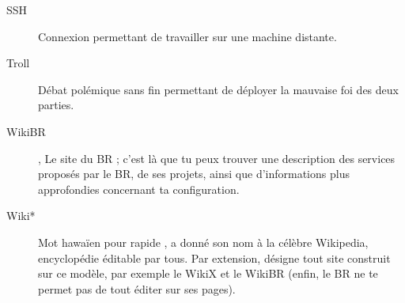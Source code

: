 \begin{description}
  \item[SSH] Connexion permettant de travailler sur une machine distante.
  \item[Troll] Débat polémique sans fin permettant de déployer la mauvaise foi des deux parties.
  \item[WikiBR] , Le site du BR ; c'est là que tu peux trouver une description des services proposés par le BR, de ses projets, ainsi que
  d'informations plus approfondies concernant ta configuration.
  \item[Wiki*] Mot hawaïen pour \og rapide \fg, a donné son nom à la célèbre Wikipedia, encyclopédie éditable par tous.
  Par extension, d\'esigne tout site construit sur ce mod\`ele, par exemple le WikiX et le WikiBR (enfin, le BR ne te permet pas de tout \'editer sur ses pages).
\end{description}
